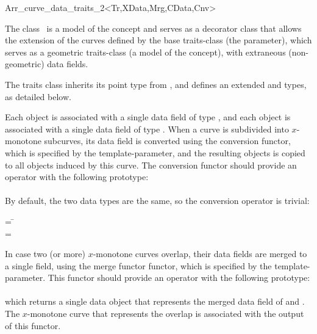 
\ccRefPageBegin
\begin{ccRefClass}{Arr_curve_data_traits_2<Tr,XData,Mrg,CData,Cnv>}

\ccDefinition

The class \ccRefName\ is a model of the  concept
and serves as a decorator class that allows the extension of the curves
defined by the base traits-class (the  parameter), which serves as a
geometric traits-class (a model of the  concept), with
extraneous (non-geometric) data fields.

The traits class inherits its point type from ,
and defines an extended  and  types,
as detailed below.

Each  object is associated with a single data field of type
, and each  object is associated with
a single data field of type . When a curve is
subdivided into $x$-monotone subcurves, its data field is converted using
the conversion functor, which is specified by the  template-parameter,
and the resulting objects is copied to all  objects
induced by this curve. The conversion functor should provide an operator with
the following prototype: \\
\indent {} \\

By default, the two data types are the same, so the conversion operator
is trivial:
\begin{tabbing}
 = \=\\
 = \>
\end{tabbing}

In case two (or more) $x$-monotone curves overlap, their data fields are
merged to a single field, using the merge functor functor, which is
specified by the  template-parameter. This functor should provide
an operator with the following prototype: \\
\indent {} \\
which returns a single data object that represents the merged data field
of  and . The $x$-monotone curve that represents the overlap
is associated with the output of this functor.


\end{ccRefClass}
